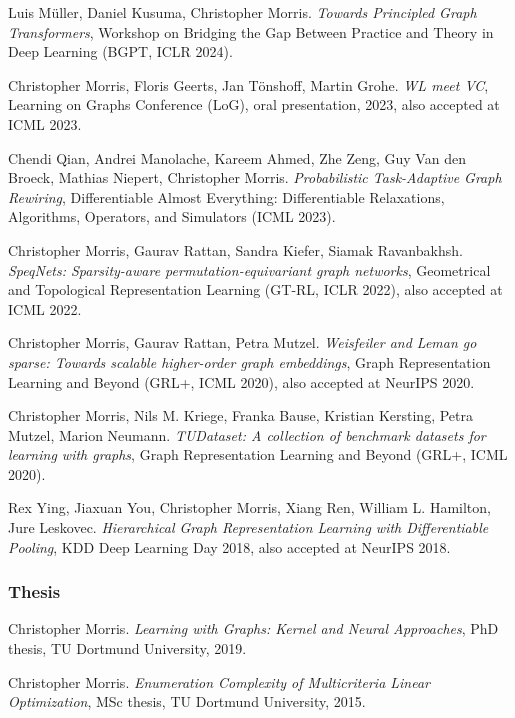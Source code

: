 \documentclass[11pt, a4paper, DIV=14, headings=small]{scrartcl}
\begin{document}
\begin{thebibliography}{15}
		Luis Müller, Daniel Kusuma, Christopher Morris.
		\emph{Towards Principled Graph Transformers},
		Workshop on Bridging the Gap Between Practice and   Theory in Deep Learning (BGPT, ICLR 2024).
		
		
		Christopher Morris, Floris Geerts, Jan Tönshoff, Martin Grohe.
		\emph{WL meet VC},
		Learning on Graphs Conference  (LoG), oral 			presentation, 2023, also accepted at ICML 2023.
						
		Chendi Qian, Andrei Manolache, Kareem Ahmed, Zhe Zeng, Guy Van den Broeck, Mathias Niepert, Christopher Morris.
		\emph{Probabilistic Task-Adaptive Graph Rewiring}, Differentiable Almost Everything: Differentiable Relaxations, Algorithms, Operators, and Simulators (ICML 2023).

		
		Christopher Morris, Gaurav Rattan, Sandra Kiefer, Siamak Ravanbakhsh.
		\emph{SpeqNets: Sparsity-aware permutation-equivariant graph networks},
		Geometrical and Topological Representation Learning (GT-RL, ICLR 2022), also accepted at ICML 2022.
		
		Christopher Morris, Gaurav Rattan, Petra Mutzel.
		\emph{Weisfeiler and Leman go sparse: Towards scalable higher-order graph embeddings},
		Graph Representation Learning and Beyond (GRL+, ICML 2020), also accepted at NeurIPS 2020.
		
		Christopher Morris, Nils M. Kriege, Franka Bause, Kristian Kersting, Petra Mutzel, Marion Neumann.
		\emph{TUDataset: A collection of benchmark datasets for learning with graphs},
		Graph Representation Learning and Beyond (GRL+, ICML 2020).
		
		Rex Ying, Jiaxuan You, Christopher Morris, Xiang Ren, William L. Hamilton, Jure Leskovec.
		\emph{Hierarchical Graph Representation Learning with Differentiable Pooling},
		KDD Deep Learning Day 2018, also accepted at NeurIPS 2018.
		
		\subsubsection*{Thesis}
		
		Christopher Morris.
		\emph{Learning with Graphs: Kernel and Neural Approaches}, PhD thesis, TU Dortmund University, 2019.
		
		Christopher Morris.
		\emph{Enumeration Complexity of Multicriteria Linear Optimization}, MSc thesis, TU Dortmund University, 2015.
		

\end{thebibliography}
\end{document}
